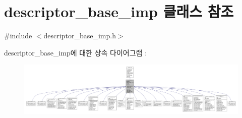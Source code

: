 \hypertarget{classavdecc__lib_1_1descriptor__base__imp}{}\section{descriptor\+\_\+base\+\_\+imp 클래스 참조}
\label{classavdecc__lib_1_1descriptor__base__imp}


{\ttfamily \#include $<$descriptor\+\_\+base\+\_\+imp.\+h$>$}



descriptor\+\_\+base\+\_\+imp에 대한 상속 다이어그램 \+: 
\nopagebreak
\begin{figure}[H]
\begin{center}
\leavevmode
\includegraphics[width=350pt]{classavdecc__lib_1_1descriptor__base__imp__inherit__graph}
\end{center}
\end{figure}


